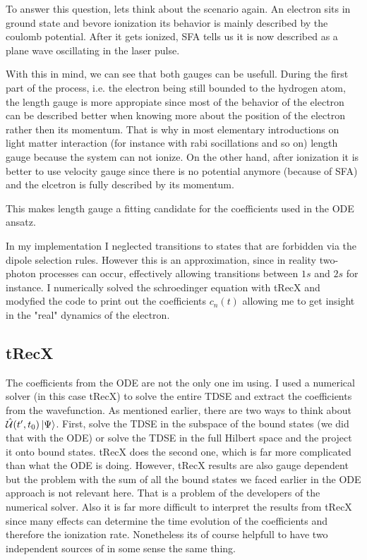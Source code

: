To answer this question, lets think about the scenario again.
An electron sits in ground state and bevore ionization its behavior is mainly described by the coulomb potential.
After it gets ionized, SFA tells us it is now described as a plane wave oscillating in the laser pulse.

With this in mind, we can see that both gauges can be usefull.
During the first part of the process, i.e. the electron being still bounded to the hydrogen atom, the length gauge is more appropiate since most of the behavior of the electron can be described better when knowing more about the position of the electron rather then its momentum.
That is why in most elementary introductions on light matter interaction (for instance with rabi socillations and so on) length gauge because the system can not ionize.
On the other hand, after ionization it is better to use velocity gauge since there is no potential anymore (because of SFA) and the elcetron is fully described by its momentum.

This makes length gauge a fitting candidate for the coefficients used in the ODE ansatz.



\bigskip
In my implementation I neglected transitions to states that are forbidden via the dipole selection rules. 
However this is an approximation, since in reality two-photon processes can occur, effectively allowing transitions between $1s$ and $2s$ for instance. 
I numerically solved the schroedinger equation with tRecX and modyfied the code to print out the coefficients $c_n(t)$ allowing me to get insight in the "real" dynamics of the electron.







\subsection{tRecX}
The coefficients from the ODE are not the only one im using. I used a numerical solver (in this case tRecX) to solve the entire TDSE and extract the coefficients from the wavefunction.
As mentioned earlier, there are two ways to think about $\hat{\mathcal{U}}(t',t_0)\ket{\Psi}$. 
First, solve the TDSE in the subspace of the bound states (we did that with the ODE) or solve the TDSE in the full Hilbert space and the project it onto bound states. 
tRecX does the second one, which is far more complicated than what the ODE is doing.
However, tRecX results are also gauge dependent but the problem with the sum of all the bound states we faced earlier in the ODE approach is not relevant here.
That is a problem of the developers of the numerical solver.
Also it is far more difficult to interpret the results from tRecX since many effects can determine the time evolution of the coefficients and therefore the ionization rate.
Nonetheless its of course helpfull to have two independent sources of in some sense the same thing.

